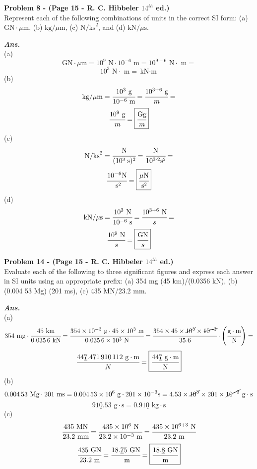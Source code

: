 \documentclass[letterpaper, 11pt]{article}
\newenvironment{problem}[2][Problem]
    { \begin{mdframed} \textbf{#1 #2} \\}
    {  \end{mdframed}}
\newenvironment{solution}
    {\textbf{\textit{Ans.}}\\}
    { }
\begin{document}
\begin{problem}{8 - (Page 15 - R. C. Hibbeler $14^{th}$ ed.)}
    Represent each of the following combinations of units
    in the correct SI form: (a) $\text{GN} \cdot \mu \text{m}$, (b) $\text{kg}/\mu \text{m}$, (c) $\text{N/ks}^2$,
    and (d) $\text{kN}/\mu \text{s}$.
\end{problem}
\begin{solution}
(a)
\[\text{GN} \cdot \mu \text{m}=10^9\text{ N}\cdot 10^{-6} \text{ m}=10^{9-6}\text{ N}\cdot \text{ m}=\]
\[10^3\text{ N}\cdot \text{ m}=\boxed{\text{kN}\cdot \text{m}}\]
(b)
\[\text{kg}/\mu \text{m}=\cfrac{10^3\text{ g}}{10^{-6}\text{ m}}=\cfrac{10^{3+6}\text{ g}}{m}=\]
\[\cfrac{10^9\text{ g}}{m}=\boxed{\cfrac{\text{Gg}}{m}}\]
(c)
\[\text{N/ks}^2=\cfrac{\text{N}}{(\text{10³ s})^2}=\cfrac{\text{N}}{10^{3\cdot 2}\text{s²}}=\]
\[\cfrac{10^{-6}\text{N}}{\text{ s²}}=\boxed{\cfrac{\mu\text{N}}{\text{s²}}}\]
(d)
\[\text{kN}/\mu \text{s}=\cfrac{10^3 \text{ N}}{10^{-6}\text{ s}}=\cfrac{10^{3+6}\text{ N}}{s}=\]
\[\cfrac{10^9 \text{ N}}{s}=\boxed{\cfrac{\text{GN}}{s}}\]
\end{solution}
\begin{problem}{14 - (Page 15 - R. C. Hibbeler $14^{th}$ ed.)}
    Evaluate each of the following to three significant
    figures and express each answer in SI units using an
    appropriate prefix: (a) 354 mg (45 km)/(0.0356 kN),
    (b) (0.004 53 Mg) (201 ms), (c) 435 MN/23.2 mm.
\end{problem}
\begin{solution}
    (a)
    \[354 \text{ mg}\cdot \cfrac{45 \text{ km}}{0.035\,6 \text{ kN}}=\cfrac{354 \times 10^{-3} \text{ g}\cdot 45\times 10^3\text{ m}}{0.035\, 6 \times 10^3 \text{ N}}=\cfrac{354 \times 45 \times \cancel{10^3}\times \cancel{10^{-3}}}{35.6}\cdot\left(\cfrac{\text{g}\cdot \text{m}}{\text{N}}\right)=\]
    \[\cfrac{44\underline{7}.471\,910\,112\text{ g}\cdot \text{m}}{N}=\boxed{\cfrac{44\underline{7}\text{ g}\cdot \text{m}}{\text{N}}}\]
    (b)
    \[0.004\,53 \text{ Mg}\cdot 201 \text{ ms}=0.004\, 53 \times 10^6 \text{ g} \cdot 201 \times 10^{-3} \text{s}=4.53\times \cancel{10^3} \times 201 \times \cancel{10^{-3}}\text{ g}\cdot \text{s}\]
    \[91\underline{0}.53\text{ g}\cdot \text{s}=\boxed{0.91\underline{0} \text{ kg}\cdot \text{s}}\]
    (c)
    \[\cfrac{435 \text{ MN}}{23.2 \text{ mm}}=\cfrac{435 \times 10^6 \text{ N}}{23.2 \times 10^{-3}\text{ m}}=\cfrac{435 \times 10^{6+3}\text{ N}}{23.2 \text{ m}}\]
    \[\cfrac{435 \text{ GN}}{23.2 \text{ m}}=\cfrac{18.\underline{7}5\text{ GN}}{\text{ m}}=\boxed{\cfrac{18.\underline{8} \text{ GN}}{\text{m}}} \]
\end{solution}
\end{document}
